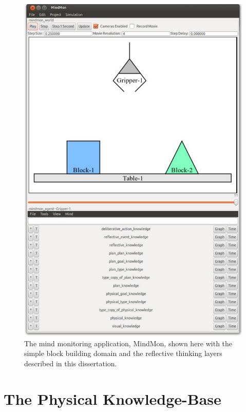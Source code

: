 \begin{figure}
\hspace*{-1cm}\includegraphics[width=13cm]{gfx/implemented_mindmon}
\caption[The mind monitoring application, MindMon.]{The mind
  monitoring application, MindMon, shown here with the simple block
  building domain and the reflective thinking layers described in this
  dissertation.}
\label{figure:implemented_mindmon}
\end{figure}

\section{The Physical Knowledge-Base}

